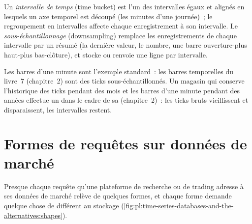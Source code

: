 \begin{definition}\label{def:pl:time-series-databases-and-the-alternatives:bucket}
Un \emph{intervalle de temps} (time bucket) est l'un des intervalles égaux et alignés en lesquels un axe temporel est découpé (les minutes d'une
journée)~; le regroupement en intervalles affecte chaque enregistrement à son intervalle. Le \emph{sous-échantillonnage} (downsampling) remplace les enregistrements de chaque intervalle
par un résumé (la dernière valeur, le nombre, une barre ouverture-plus haut-plus bas-clôture), et stocke ou renvoie une ligne par intervalle.
\end{definition}

Les barres d'une minute sont l'exemple standard~: les barres temporelles du livre~7 (chapitre~2) sont des ticks sous-échantillonnés. Un magasin
qui conserve l'historique des ticks pendant des mois et les barres d'une minute pendant des années effectue un  dans le cadre de sa  (chapitre~2)~: les ticks bruts
vieillissent et disparaissent, les intervalles restent.

\section{Formes de requêtes sur données de marché}

Presque chaque requête qu'une plateforme de recherche ou de trading adresse à ses données de marché relève de quelques formes, et chaque forme
demande quelque chose de différent au stockage (\cref{fig:pl:time-series-databases-and-the-alternatives:shapes}).

